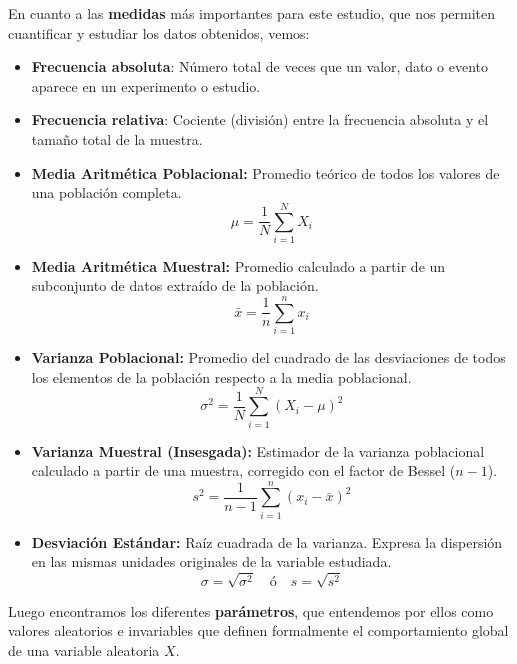 \documentclass{article}
\begin{document}
En cuanto a las \textbf{medidas} más importantes para este estudio,  que nos permiten cuantificar y estudiar los datos obtenidos, vemos:
\begin{itemize}
    \item \textbf{Frecuencia absoluta}: Número total de veces que un valor, dato o evento aparece en un experimento o estudio. 
    \item \textbf{Frecuencia relativa}: Cociente (división) entre la frecuencia absoluta  y el tamaño total de la muestra. 
\end{itemize}
\begin{itemize}

    \item \textbf{Media Aritmética Poblacional:} Promedio teórico de todos los valores de una población completa.
    \[ \mu = \frac{1}{N} \sum_{i=1}^{N} X_i \]
    
    \item \textbf{Media Aritmética Muestral:} Promedio calculado a partir de un subconjunto de datos extraído de la población.
    \[ \bar{x} = \frac{1}{n} \sum_{i=1}^{n} x_i \]
    
    \item \textbf{Varianza Poblacional:} Promedio del cuadrado de las desviaciones de todos los elementos de la población respecto a la media poblacional.
    \[ \sigma^2 = \frac{1}{N} \sum_{i=1}^{N} (X_i - \mu)^2 \]
    
    \item \textbf{Varianza Muestral (Insesgada):} Estimador de la varianza poblacional calculado a partir de una muestra, corregido con el factor de Bessel ($n-1$).
    \[ s^2 = \frac{1}{n-1} \sum_{i=1}^{n} (x_i - \bar{x})^2 \]
    
    \item \textbf{Desviación Estándar:} Raíz cuadrada de la varianza. Expresa la dispersión en las mismas unidades originales de la variable estudiada.
    \[ \sigma = \sqrt{\sigma^2} \quad \text{ó} \quad s = \sqrt{s^2} \]

\end{itemize}

Luego encontramos los diferentes \textbf{parámetros}, que entendemos por ellos como valores aleatorios e invariables que definen formalmente el comportamiento global de una variable aleatoria $X$. 
\end{document}
